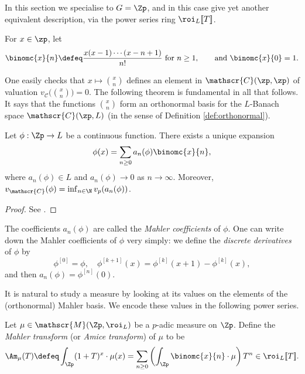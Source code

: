 \documentclass[a4paper,10pt, english, reqno]{smfart}
\newcommand{\lsem}{[\! [}
\newcommand{\rsem}{]\! ]}
\numberwithin{equation}{section}
\begin{document}
In this section we specialise to $G = \Zp$, and in this case give yet another equivalent description, via the power series ring $\roi_L\lsem T\rsem$.

\begin{definition}\label{def:binomial polynomials}
For $x \in \zp$, let
\[\binomc{x}{n} \defeq \frac{x(x-1)\cdots(x-n+1)}{n!} \text{ for }n \geq 1, \qquad \text{and } \binomc{x}{0} = 1.\]
\end{definition}

One easily checks that $x \mapsto {x \choose n}$ defines an element in $\mathscr{C}(\zp, \zp)$ of valuation $v_{\mathscr{C}}\big( {x \choose n} \big) = 0$. The following theorem is fundamental in all that follows. It says that the functions ${x \choose n}$ form an orthonormal basis for the $L$-Banach space $\mathscr{C}(\zp, L)$ (in the sense of Definition \ref{def:orthonormal}).

\begin{theorem}[Mahler]\label{thm:Mahler}
Let $\phi : \Zp \rightarrow L$ be a continuous function. There exists a unique expansion
\[ \phi(x) = \sum_{n\geq 0} a_n(\phi) \binomc{x}{n}, \]
where $a_n(\phi) \in L$ and $a_n(\phi) \rightarrow 0$ as $n\rightarrow \infty$. Moreover, $v_{\mathscr{C}}(\phi) = \inf_{n \in \N} v_p(a_n(\phi))$.
\end{theorem}

\begin{proof}
See \cite[Théorème 1.2.3.]{Colm10}.
\end{proof}

\begin{remark}
The coefficients $a_n(\phi)$ are called the \emph{Mahler coefficients} of $\phi$. 
One can write down the Mahler coefficients of $\phi$ very simply: we define the \emph{discrete derivatives} of $\phi$ by 
\[\phi^{[0]} = \phi,\hspace{12pt} \phi^{[k+1]}(x) = \phi^{[k]}(x+1) - \phi^{[k]}(x),\]
and then $a_n(\phi) = \phi^{[n]}(0).$
\end{remark}

 It is natural to study a measure by looking at its values on the elements of the (orthonormal) Mahler basis. We encode these values in the following power series.

\begin{definition}
Let  $\mu \in \mathscr{M}(\Zp, \roi_L)$ be a $p$-adic measure on $\Zp$. Define the \emph{Mahler transform} (or \emph{Amice transform}) of $\mu$ to be
\[\Am_\mu(T) \defeq \int_{\Zp} (1+T)^x \cdot \mu (x) = \sum_{n\geq 0} \left(\int_{\Zp} \binomc{x}{n} \cdot\mu \right) T^n \in \roi_L\lsem T\rsem .\]
\end{definition}
\end{document}
